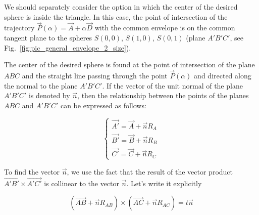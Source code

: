 \documentclass[
11pt,%
tightenlines,%
twoside,%
onecolumn,%
nofloats,%
nobibnotes,%
nofootinbib,%
superscriptaddress,%
noshowpacs,%
centertags]%
{revtex4-2}
\begin{document}
We should separately consider the option in which the center of the desired sphere is inside the triangle.
In this case, the point of intersection of the trajectory $\vec{P}(\alpha) = \vec{A} + \alpha \vec{D}$ with the common envelope is on the common tangent plane to the spheres $S(0, 0)$, $S(1, 0)$, $S(0, 1)$ (plane $A'B'C'$, see Fig.~\ref{fig:pic_general_envelope_2_size}).

The center of the desired sphere is found at the point of intersection of the plane $ABC$ and the straight line passing through the point $\vec{P}(\alpha)$ and directed along the normal to the plane $A'B'C'$.
If the vector of the unit normal of the plane $A'B'C'$ is denoted by $\vec{n}$, then the relationship between the points of the planes $ABC$ and $A'B'C'$ can be expressed as follows:

\begin{equation}
\begin{cases}
\vec{A'} = \vec{A} + \vec{n} R_A \\
\vec{B'} = \vec{B} + \vec{n} R_B \\
\vec{C'} = \vec{C} + \vec{n} R_C
\end{cases}
\end{equation}

To find the vector $\vec{n}$, we use the fact that the result of the vector product $\vec{A'B'} \times \vec{A'C'}$ is collinear to the vector $\vec{n}$.
Let's write it explicitly

\begin{equation}
(\vec{AB} + \vec{n} R_{AB}) \times (\vec{AC} + \vec{n} R_{AC}) = t \vec{n}
\end{equation}
\end{document}
